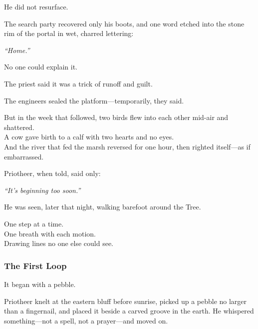 \documentclass[12pt]{article}
\begin{document}
\vspace{0.5em}
He did not resurface.

\vspace{0.5em}
The search party recovered only his boots, and one word etched into the stone rim of the portal in wet, charred lettering:

\vspace{0.5em}
\textit{``Home.''}

\vspace{0.5em}
No one could explain it.

\vspace{0.5em}
The priest said it was a trick of runoff and guilt.

\vspace{0.5em}
The engineers sealed the platform---temporarily, they said.

\vspace{0.5em}
But in the week that followed, two birds flew into each other mid-air and shattered.\\
A cow gave birth to a calf with two hearts and no eyes.\\
And the river that fed the marsh reversed for one hour, then righted itself---as if embarrassed.

\vspace{0.5em}
Priotheer, when told, said only:

\vspace{0.5em}
\textit{``It’s beginning too soon.''}

\vspace{0.5em}
He was seen, later that night, walking barefoot around the Tree.

\vspace{0.5em}
One step at a time.\\
One breath with each motion.\\
Drawing lines no one else could see.

\dotfill

\subsubsection*{The First Loop}

It began with a pebble.

\vspace{0.5em}
Priotheer knelt at the eastern bluff before sunrise, picked up a pebble no larger than a fingernail, and placed it beside a carved groove in the earth. He whispered something---not a spell, not a prayer---and moved on.
\end{document}
